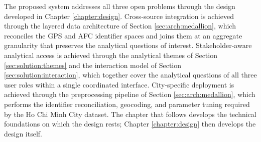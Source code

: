 The proposed system addresses all three open problems through the design developed in
Chapter \ref{chapter:design}. Cross-source integration is achieved through the
layered data architecture of Section \ref{sec:arch:medallion}, which reconciles
the GPS and AFC identifier spaces and joins them at an aggregate granularity that
preserves the analytical questions of interest. Stakeholder-aware analytical access is
achieved through the analytical themes of Section \ref{sec:solution:themes} and the
interaction model of Section \ref{sec:solution:interaction}, which together cover the
analytical questions of all three user roles within a single coordinated interface.
City-specific deployment is achieved through the preprocessing pipeline of Section
\ref{sec:arch:medallion}, which performs the identifier reconciliation,
geocoding, and parameter tuning required by the Ho Chi Minh City dataset. The chapter
that follows develops the technical foundations on which the design rests; Chapter
\ref{chapter:design} then develops the design itself.
